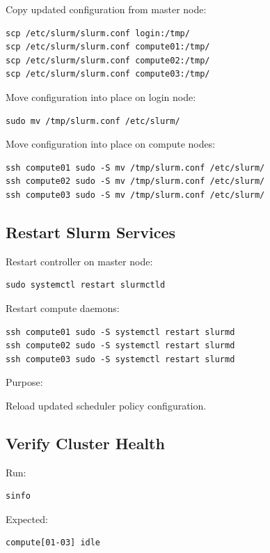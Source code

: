 \documentclass[11pt]{article}
\begin{document}
Copy updated configuration from master node:

\begin{verbatim}
scp /etc/slurm/slurm.conf login:/tmp/
scp /etc/slurm/slurm.conf compute01:/tmp/
scp /etc/slurm/slurm.conf compute02:/tmp/
scp /etc/slurm/slurm.conf compute03:/tmp/
\end{verbatim}

Move configuration into place on login node:

\begin{verbatim}
sudo mv /tmp/slurm.conf /etc/slurm/
\end{verbatim}

Move configuration into place on compute nodes:

\begin{verbatim}
ssh compute01 sudo -S mv /tmp/slurm.conf /etc/slurm/
ssh compute02 sudo -S mv /tmp/slurm.conf /etc/slurm/
ssh compute03 sudo -S mv /tmp/slurm.conf /etc/slurm/
\end{verbatim}
\subsection{Restart Slurm Services}
\label{sec:orgc112298}

Restart controller on master node:

\begin{verbatim}
sudo systemctl restart slurmctld
\end{verbatim}

Restart compute daemons:

\begin{verbatim}
ssh compute01 sudo -S systemctl restart slurmd
ssh compute02 sudo -S systemctl restart slurmd
ssh compute03 sudo -S systemctl restart slurmd
\end{verbatim}

Purpose:

Reload updated scheduler policy configuration.
\subsection{Verify Cluster Health}
\label{sec:org73cd967}

Run:

\begin{verbatim}
sinfo
\end{verbatim}

Expected:

\begin{verbatim}
compute[01-03] idle
\end{verbatim}
\end{document}
